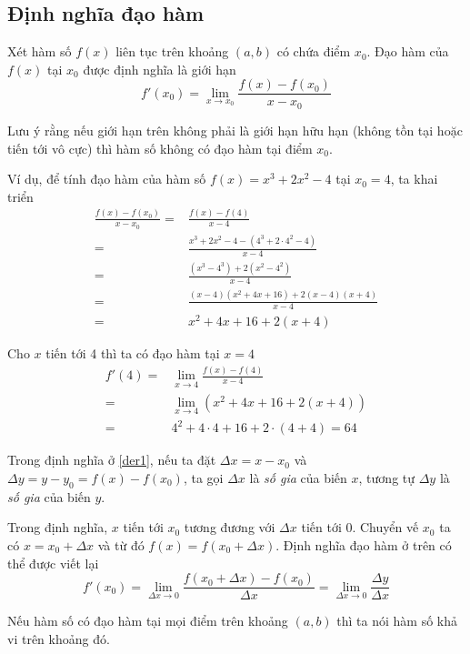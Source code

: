 \subsection{Định nghĩa đạo hàm}

Xét hàm số $f(x)$ liên tục trên khoảng $(a, b)$ có chứa điểm $x_0$. Đạo hàm của $f(x)$ tại $x_0$ được định nghĩa là giới hạn
\begin{equation}
	f'(x_0) = \lim_{x \to x_0} \frac{f(x) - f(x_0)}{x - x_0}
	\label{der1}
\end{equation}

Lưu ý rằng nếu giới hạn trên không phải là giới hạn hữu hạn (không tồn tại hoặc tiến tới vô cực) thì hàm số không có đạo hàm tại điểm $x_0$.

Ví dụ, để tính đạo hàm của hàm số $f(x) = x^3 + 2 x^2 - 4$ tại $x_0 = 4$, ta khai triển
\begin{align*}
	\frac{f(x) - f(x_0)}{x - x_0} = & \frac{f(x) - f(4)}{x - 4} \\ = & \frac{x^3 + 2x^2 - 4 - (4^3 + 2 \cdot 4^2 - 4)}{x - 4} \\ = & \frac{(x^3 - 4^3) + 2(x^2 - 4^2)}{x - 4} \\ = & \frac{(x-4)(x^2 + 4x + 16) + 2 (x-4)(x+4)}{x - 4} \\ = & x^2 + 4 x + 16 + 2(x+4)
\end{align*}

Cho $x$ tiến tới 4 thì ta có đạo hàm tại $x = 4$
\begin{align*}
	f'(4) = & \lim_{x \to 4} \frac{f(x) - f(4)}{x - 4} \\ = & \lim_{x \to 4} (x^2 + 4x + 16 + 2(x+4)) \\ = & 4^2 + 4 \cdot 4 + 16 + 2 \cdot (4 + 4) = 64
\end{align*}

Trong định nghĩa ở \ref{der1}, nếu ta đặt $\Delta x = x - x_0$ và $\Delta y = y - y_0 = f(x) - f(x_0)$, ta gọi $\Delta x$ là \textit{số gia} của biến $x$, tương tự $\Delta y$ là \textit{số gia} của biến $y$.

Trong định nghĩa, $x$ tiến tới $x_0$ tương đương với $\Delta x$ tiến tới 0. Chuyển vế $x_0$ ta có $x = x_0 + \Delta x$ và từ đó $f(x) = f(x_0 + \Delta x)$. Định nghĩa đạo hàm ở trên có thể được viết lại
\begin{equation}
	f'(x_0) = \lim_{\Delta x \to 0} \frac{f(x_0 + \Delta x) - f(x_0)}{\Delta x} = \lim_{\Delta x \to 0} \frac{\Delta y}{\Delta x}
\end{equation}

Nếu hàm số có đạo hàm tại mọi điểm trên khoảng $(a, b)$ thì ta nói hàm số khả vi trên khoảng đó.

